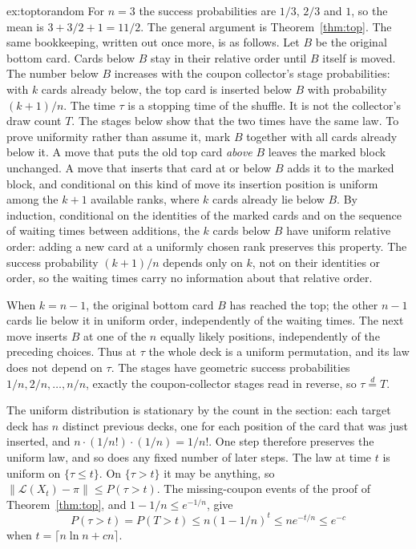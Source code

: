 \begin{solution}{ex:toptorandom}
\writeup For $n=3$ the success probabilities are $1/3$, $2/3$ and $1$, so the mean is $3+3/2+1=11/2$. The general argument is Theorem~\ref{thm:top}. The same bookkeeping, written out once more, is as follows. Let $B$ be the original bottom card. Cards below $B$ stay in their relative order until $B$ itself is moved. The number below $B$ increases with the coupon collector's stage probabilities: with $k$ cards already below, the top card is inserted below $B$ with probability $(k+1)/n$. The time $\tau$ is a stopping time of the shuffle. It is not the collector's draw count $T$. The stages below show that the two times have the same law. To prove uniformity rather than assume it, mark $B$ together with all cards already below it. A move that puts the old top card \emph{above} $B$ leaves the marked block unchanged. A move that inserts that card at or below $B$ adds it to the marked block, and conditional on this kind of move its insertion position is uniform among the $k+1$ available ranks, where $k$ cards already lie below $B$. By induction, conditional on the identities of the marked cards and on the sequence of waiting times between additions, the $k$ cards below $B$ have uniform relative order: adding a new card at a uniformly chosen rank preserves this property. The success probability $(k+1)/n$ depends only on $k$, not on their identities or order, so the waiting times carry no information about that relative order.

When $k=n-1$, the original bottom card $B$ has reached the top; the other $n-1$ cards lie below it in uniform order, independently of the waiting times. The next move inserts $B$ at one of the $n$ equally likely positions, independently of the preceding choices. Thus at $\tau$ the whole deck is a uniform permutation, and its law does not depend on $\tau$. The stages have geometric success probabilities $1/n,2/n,\ldots,n/n$, exactly the coupon-collector stages read in reverse, so $\tau\stackrel d=T$.

The uniform distribution is stationary by the count in the section: each target deck has $n$ distinct previous decks, one for each position of the card that was just inserted, and $n\cdot(1/n!)\cdot(1/n)=1/n!$. One step therefore preserves the uniform law, and so does any fixed number of later steps. The law at time $t$ is uniform on $\{\tau\le t\}$. On $\{\tau>t\}$ it may be anything, so $\|\mathcal L(X_t)-\pi\|\le P(\tau>t)$. The missing-coupon events of the proof of Theorem~\ref{thm:top}, and $1-1/n\le e^{-1/n}$, give
\[
P(\tau>t)=P(T>t)\le n(1-1/n)^t\le ne^{-t/n}\le e^{-c}
\]
when $t=\lceil n\ln n+cn\rceil$.
\end{solution}

